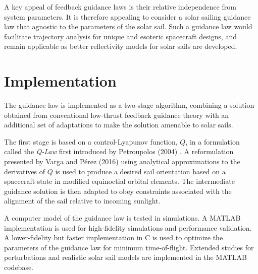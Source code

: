A key appeal of feedback guidance laws is their relative independence from system parameters. It is therefore appealing to consider a solar sailing guidance law that agnostic to the parameters of the solar sail. Such a guidance law would facilitate trajectory analysis for unique and esoteric spacecraft designs, and remain applicable as better reflectivity models for solar sails are developed.

\section{Implementation}
The guidance law is implemented as a two-stage algorithm, combining a solution obtained from conventional low-thrust feedback guidance theory with an additional set of adaptations to make the solution amenable to solar sails.

The first stage is based on a control-Lyapunov function, \(Q\), in a formulation called the \textit{Q-Law} first introduced by Petroupolos (2004) \cite{petropoulos2004low}. A reformulation presented by Varga and Pérez (2016) \cite{vargaperez2016} using analytical approximations to the derivatives of \(Q\) is used to produce a desired sail orientation based on a spacecraft state in modified equinoctial orbital elements. The intermediate guidance solution is then adapted to obey constraints associated with the alignment of the sail relative to incoming sunlight.

A computer model of the guidance law is tested in simulations. A MATLAB implementation is used for high-fidelity simulations and performance validation. A lower-fidelity but faster implementation in C is used to optimize the parameters of the guidance law for minimum time-of-flight. Extended studies for perturbations and realistic solar sail models are implemented in the MATLAB codebase.